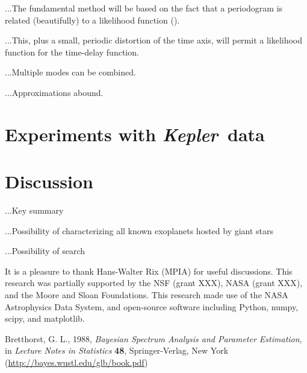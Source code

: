 \documentclass[12pt, preprint]{aastex}
\newcommand{\project}[1]{\textsl{#1}}
\newcommand{\Kepler}{\project{Kepler}}
\begin{document}
...The fundamental method will be based on the fact that a periodogram
is related (beautifully) to a likelihood function
(\citealt{bretthorst}).

...This, plus a small, periodic distortion of the time axis, will
permit a likelihood function for the time-delay function.

...Multiple modes can be combined.

...Approximations abound.

\section{Experiments with \Kepler\ data}

\section{Discussion}

...Key summary

...Possibility of characterizing all known exoplanets hosted by giant stars

...Possibility of search

\acknowledgements
It is a pleasure to thank
  Hans-Walter Rix (MPIA)
for useful discussions.
This research was partially supported by the NSF (grant XXX), NASA
(grant XXX), and the Moore and Sloan Foundations.
This research made use of the NASA Astrophysics Data System, and
open-source software including Python, numpy, scipy, and matplotlib.

\begin{thebibliography}{}\raggedright
{}
  Bretthorst, G. L., 1988,
  \textit{Bayesian Spectrum Analysis and Parameter Estimation},
  in \textit{Lecture Notes in Statistics} \textbf{48},
  Springer-Verlag, New York
  \footnotesize{(\url{http://bayes.wustl.edu/glb/book.pdf})}
\end{thebibliography}
\end{document}
